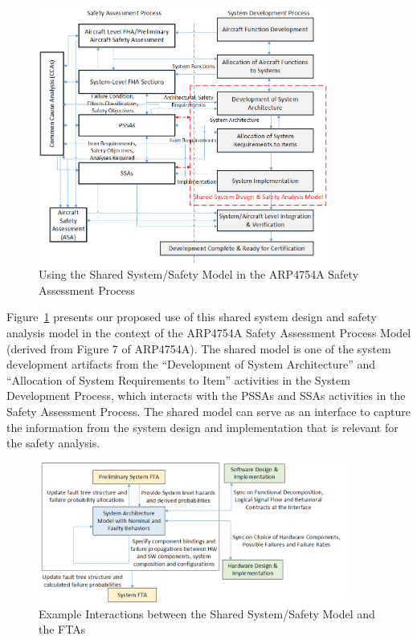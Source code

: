 \begin{figure}[t!]
	\vspace{-0.19in}
	\centering
	\includegraphics[trim=0 9 0 5,clip,width=0.85\textwidth]{images/Safety_Assessment_Process.png}
	\caption{Using the Shared System/Safety Model in the ARP4754A Safety Assessment Process}
	\label{fig:proposed_safety_process}
\end{figure}

Figure~\ref{fig:proposed_safety_process} presents our proposed use of this shared system design and safety analysis model in the context of the ARP4754A Safety Assessment Process Model (derived from Figure 7 of ARP4754A). The shared model is one of the system development artifacts from the ``Development of System Architecture'' and ``Allocation of System Requirements to Item'' activities in the System Development Process, which interacts with the PSSAs and SSAs activities in the Safety Assessment Process. The shared model can serve as an interface to capture the information from the system design and implementation that is relevant for the safety analysis.

\begin{figure}[t!]
	\vspace{-0.19in}
	\centering
	\includegraphics[width=0.9\textwidth]{images/FTA_MBD_Workflow.png}
	\caption{Example Interactions between the Shared System/Safety Model and the FTAs}
	\label{fig:interaction_with_FTA}
\end{figure}

